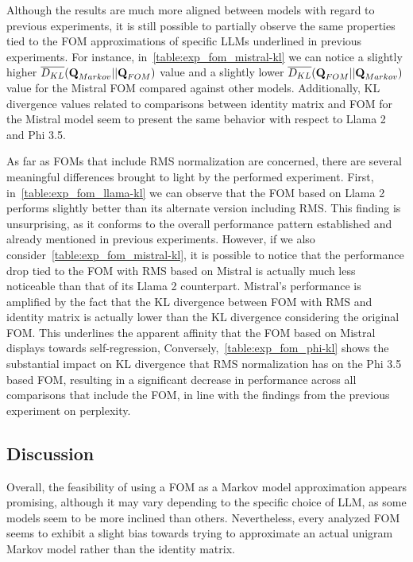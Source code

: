 Although the results are much more aligned between models with regard to previous experiments, it is still possible to partially observe the same properties tied to the FOM approximations of specific LLMs underlined in previous experiments.
For instance, in~\cref{table:exp_fom_mistral-kl} we can notice a slightly higher ${\overline {D_{KL}}}(\bm{\mathbf{Q}}_{Markov} || \bm{\mathbf{Q}}_{FOM})$ value and a slightly lower ${\overline {D_{KL}}}(\bm{\mathbf{Q}}_{FOM} || \bm{\mathbf{Q}}_{Markov})$ value for the Mistral FOM compared against other models.
Additionally, KL divergence values related to comparisons between identity matrix and FOM for the Mistral model seem to present the same behavior with respect to Llama 2 and Phi 3.5.

As far as FOMs that include RMS normalization are concerned, there are several meaningful differences brought to light by the performed experiment.
First, in~\cref{table:exp_fom_llama-kl} we can observe that the FOM based on Llama 2 performs slightly better than its alternate version including RMS\@.
This finding is unsurprising, as it conforms to the overall performance pattern established and already mentioned in previous experiments.
However, if we also consider~\cref{table:exp_fom_mistral-kl}, it is possible to notice that the performance drop tied to the FOM with RMS based on Mistral is actually much less noticeable than that of its Llama 2 counterpart.
Mistral's performance is amplified by the fact that the KL divergence between FOM with RMS and identity matrix is actually lower than the KL divergence considering the original FOM\@.
This underlines the apparent affinity that the FOM based on Mistral displays towards self-regression,
Conversely,~\cref{table:exp_fom_phi-kl} shows the substantial impact on KL divergence that RMS normalization has on the Phi 3.5 based FOM, resulting in a significant decrease in performance across all comparisons that include the FOM, in line with the findings from the previous experiment on perplexity.

\subsection{Discussion}\label{ssec:exp_fom_discussion}

Overall, the feasibility of using a FOM as a Markov model approximation appears promising, although it may vary depending to the specific choice of LLM, as some models seem to be more inclined than others.
Nevertheless, every analyzed FOM seems to exhibit a slight bias towards trying to approximate an actual unigram Markov model rather than the identity matrix.

